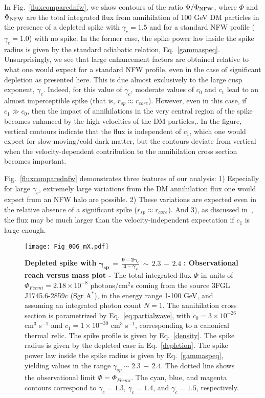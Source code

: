\documentclass[11pt]{article}
\begin{document}
In Fig.~\ref{fluxcomparednfw}, we show contours of the ratio $\Phi/\Phi_{\rm{NFW}}$, where $\Phi$ and $\Phi_{\rm{NFW}}$ are the total integrated flux from annihilation of 100 GeV DM particles in the presence of a depleted spike with $\gamma_c=1.5$ and for a standard NFW profile ($\gamma_c=1.0$) with no spike. In the former case, the spike power law inside the spike radius is given by the standard adiabatic relation, Eq.~\ref{gammaspeq}. Unsurprisingly, we see that large enhancement factors are obtained relative to what one would expect for a standard NFW profile, even in the case of significant depletion as presented here.  This is due almost exclusively to the large cusp exponent, $\gamma_c$.  Indeed, for this value of $\gamma_c$, moderate values of $c_0$ and $c_1$ lead to an almost imperceptible spike (that is, $r_{sp} \approx r_{core}$).  However, even in this case, if $c_1\gg c_0$, then the impact of annihilations in the very central region of the spike becomes enhanced by the high velocities of the DM particles,.  In the figure, vertical contours indicate that the flux is independent of $c_1$, which one would expect for slow-moving/cold dark matter, but the contours deviate from vertical when the velocity-dependent contribution to the annihilation cross section becomes important.  

Fig.~\ref{fluxcomparednfw} demonstrates three features of our analysis:  1) Especially for large $\gamma_c$, extremely large variations from the DM annihilation flux one would expect from an NFW halo are possible.  2) These variations are expected even in the relative absence of a significant spike ($r_{sp}\approx r_{core}$).  And 3), as discussed in~\cite{Fields:2014pia}, the flux may be much larger than the velocity-independent expectation if $c_1$ is large enough.


   \begin{figure}[ht]
  \centering
  {\texttt{[image: Fig\_006\_mX.pdf]}}
    \caption{\textbf{Depleted spike with} $\mathbf{\gamma_{sp} \, = \, \frac{9-2 \gamma_c}{4 - \gamma_c}} \, \sim \, 2.3 \, - \, 2.4$ \textbf{: Observational reach versus mass plot - } The total integrated flux $\Phi$ in units of  $ \Phi_{Fermi} = 2.18 \times 10^{-8}$ photons/cm$^2$s coming from the source 3FGL J1745.6-2859c (Sgr A$^*$), in the energy range 1-100 GeV, and assuming an integrated photon count $N=1$. The annihilation cross section is parametrized by Eq.~\ref{eq:partialwave}, with $c_0 = 3 \times 10^{-26}$ cm$^{3}$ s$^{-1}$ and $c_1 = 1 \times 10^{-30}$ cm$^{3}$ s$^{-1}$, corresponding to a canonical thermal relic. The spike profile is given by Eq.~\ref{density}. The spike radius is given by the depleted case in Eq.~\ref{depletion}. The spike power law inside the spike radius is given by Eq.~\ref{gammaspeq}, yielding values in the range $\gamma_{sp} \sim 2.3 \, - \, 2.4$. The dotted line shows the observational limit $\Phi = \Phi_{Fermi}$.  The cyan, blue, and magenta contours correspond to $\gamma_c = 1.3$,  $\gamma_c = 1.4$, and  $\gamma_c = 1.5$, respectively.}
    \label{fluxcomparedobserva}
\end{figure}
\end{document}
